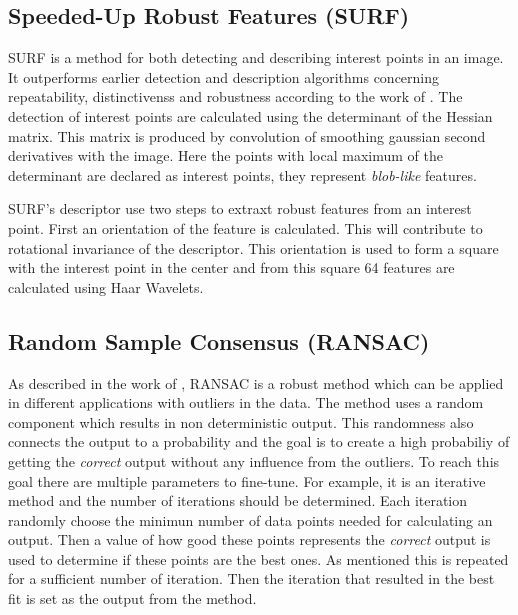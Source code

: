 \subsection{Speeded-Up Robust Features (SURF)}
SURF is a method for both detecting and describing interest points in an image.
It outperforms earlier detection and description algorithms concerning repeatability, distinctivenss and robustness according to the work of \cite{SURF}.
The detection of interest points are calculated using the determinant of the Hessian matrix.
This matrix is produced by convolution of smoothing gaussian second derivatives with the image.
Here the points with local maximum of the determinant are declared as interest points, they represent {\it blob-like} features.

SURF's descriptor use two steps to extraxt robust features from an interest point.
First an orientation of the feature is calculated.
This will contribute to rotational invariance of the descriptor.
This orientation is used to form a square with the interest point in the center and from this square 64 features are calculated using Haar Wavelets.

\subsection{Random Sample Consensus (RANSAC)}
As described in the work of \cite{RANSAC}, RANSAC is a robust method which can be applied in different applications with outliers in the data. The method uses a random component which results in non deterministic output. This randomness also connects the output to a probability and the goal is to create a high probabiliy of getting the {\it correct} output without any influence from the outliers. To reach this goal there are multiple parameters to fine-tune. For example, it is an iterative method and the number of iterations should be determined. Each iteration randomly choose the minimun number of data points needed for calculating an output. Then a value of how good these points represents the {\it correct} output is used to determine if these points are the best ones. As mentioned this is repeated for a sufficient number of iteration. Then the iteration that resulted in the best fit is set as the output from the method.
